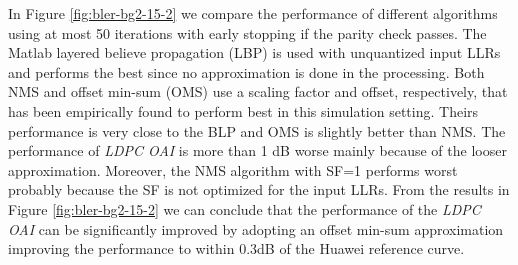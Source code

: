 \documentclass{article}
\begin{document}
In Figure \ref{fig:bler-bg2-15-2} we compare the performance of different algorithms using at most 50 iterations with early stopping if the parity check passes. The Matlab layered believe propagation (LBP) is used with unquantized input LLRs and performs the best since no approximation is done in the processing. Both NMS and offset min-sum (OMS) use a scaling factor and offset, respectively, that has been empirically found to perform best in this simulation setting. Theirs performance is very close to the BLP and OMS is slightly better than NMS. The performance of \textit{LDPC OAI} is more than 1 dB worse mainly because of the looser approximation. Moreover, the NMS algorithm with SF=1 performs worst probably because the SF is not optimized for the input LLRs. From the results in Figure \ref{fig:bler-bg2-15-2} we can conclude that the performance of the \textit{LDPC OAI} can be significantly improved by adopting an offset min-sum approximation improving the performance to within 0.3dB of the Huawei reference curve.
\end{document}
